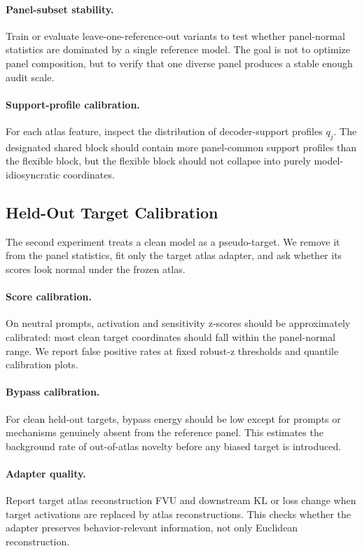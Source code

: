 \documentclass[11pt]{article}
\begin{document}
\paragraph{Panel-subset stability.}
Train or evaluate leave-one-reference-out variants to test whether panel-normal statistics are dominated by a single reference model. The goal is not to optimize panel composition, but to verify that one diverse panel produces a stable enough audit scale.

\paragraph{Support-profile calibration.}
For each atlas feature, inspect the distribution of decoder-support profiles $q_j$. The designated shared block should contain more panel-common support profiles than the flexible block, but the flexible block should not collapse into purely model-idiosyncratic coordinates.

\subsection{Held-Out Target Calibration}

The second experiment treats a clean model as a pseudo-target. We remove it from the panel statistics, fit only the target atlas adapter, and ask whether its scores look normal under the frozen atlas.

\paragraph{Score calibration.}
On neutral prompts, activation and sensitivity z-scores should be approximately calibrated: most clean target coordinates should fall within the panel-normal range. We report false positive rates at fixed robust-z thresholds and quantile calibration plots.

\paragraph{Bypass calibration.}
For clean held-out targets, bypass energy should be low except for prompts or mechanisms genuinely absent from the reference panel. This estimates the background rate of out-of-atlas novelty before any biased target is introduced.

\paragraph{Adapter quality.}
Report target atlas reconstruction FVU and downstream KL or loss change when target activations are replaced by atlas reconstructions. This checks whether the adapter preserves behavior-relevant information, not only Euclidean reconstruction.
\end{document}
